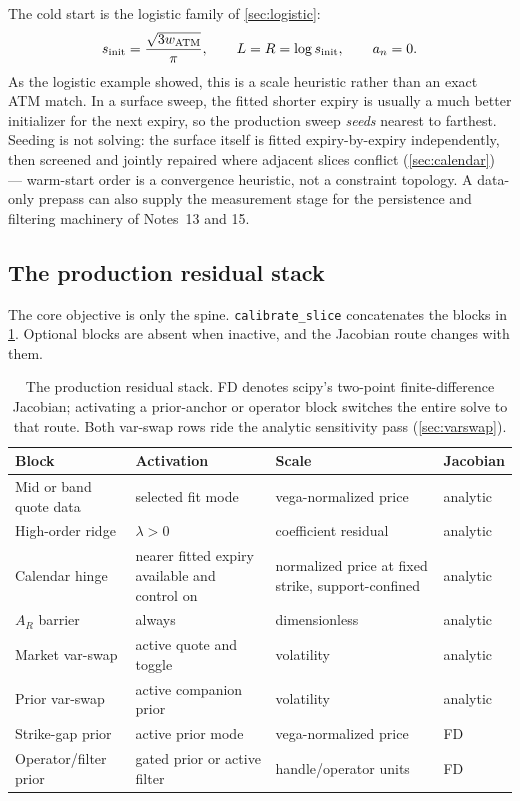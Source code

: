 \documentclass[11pt]{article}
\begin{document}
The cold start is the logistic family of \cref{sec:logistic}:
\begin{equation}
s_{\rm init}=\frac{\sqrt{3w_{\rm ATM}}}{\pi},\qquad
L=R=\log s_{\rm init},\qquad a_n=0.
\label{eq:cold_start}
\end{equation}
As the logistic example showed, this is a scale heuristic rather than an exact
ATM match.  In a surface sweep, the fitted shorter expiry is usually a much
better initializer for the next expiry, so the production sweep \emph{seeds}
nearest to farthest.  Seeding is not solving: the surface itself is fitted
expiry-by-expiry independently, then screened and jointly repaired where
adjacent slices conflict (\cref{sec:calendar}) --- warm-start order is a
convergence heuristic, not a constraint topology.  A data-only prepass can
also supply the measurement stage for the persistence and filtering machinery
of Notes~13 and 15.

\subsection{The production residual stack}
\label{sec:residual_stack}

The core objective is only the spine.  \texttt{calibrate\_slice} concatenates
the blocks in \cref{tab:stack}.  Optional blocks are absent when inactive, and
the Jacobian route changes with them.

\begin{table}[H]
\centering\small
\setlength{\tabcolsep}{4pt}
\begin{tabular}{@{}p{}p{}p{}p{}@{}}
\toprule
Block & Activation & Scale & Jacobian\\
\midrule
Mid or band quote data & selected fit mode & vega-normalized price & analytic\\
High-order ridge & $\lambda>0$ & coefficient residual & analytic\\
Calendar hinge & nearer fitted expiry available and control on & normalized
price at fixed strike, support-confined & analytic\\
$A_R$ barrier & always & dimensionless & analytic\\
Market var-swap & active quote and toggle & volatility & analytic\\
Prior var-swap & active companion prior & volatility & analytic\\
\midrule
Strike-gap prior & active prior mode & vega-normalized price & FD\\
Operator/filter prior & gated prior or active filter & handle/operator units &
FD\\
\bottomrule
\end{tabular}
\caption{The production residual stack.  FD denotes scipy's two-point
finite-difference Jacobian; activating a prior-anchor or operator block
switches the entire solve to that route.  Both var-swap rows ride the
analytic sensitivity pass (\cref{sec:varswap}).}
\label{tab:stack}
\end{table}
\end{document}
